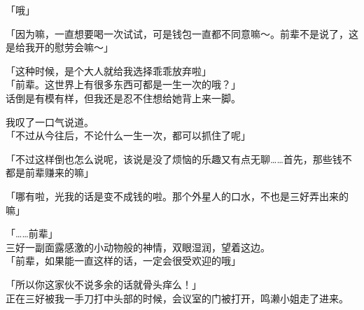 「哦」

「因为嘛，一直想要喝一次试试，可是钱包一直都不同意嘛～。前辈不是说了，这是给我开的慰劳会嘛～」

「这种时候，是个大人就给我选择乖乖放弃啦」\\

「前辈。这世界上有很多东西可都是一生一次的哦？」\\

话倒是有模有样，但我还是忍不住想给她背上来一脚。

我叹了一口气说道。\\

「不过从今往后，不论什么一生一次，都可以抓住了呢」

「不过这样倒也怎么说呢，该说是没了烦恼的乐趣又有点无聊……首先，那些钱不都是前辈赚来的嘛」

「哪有啦，光我的话是变不成钱的啦。那个外星人的口水，不也是三好弄出来的嘛」

「……前辈」\\

三好一副面露感激的小动物般的神情，双眼湿润，望着这边。\\

「前辈，如果能一直这样的话，一定会很受欢迎的哦」

「所以你这家伙不说多余的话就骨头痒么！」\\

正在三好被我一手刀打中头部的时候，会议室的门被打开，鸣濑小姐走了进来。\\

